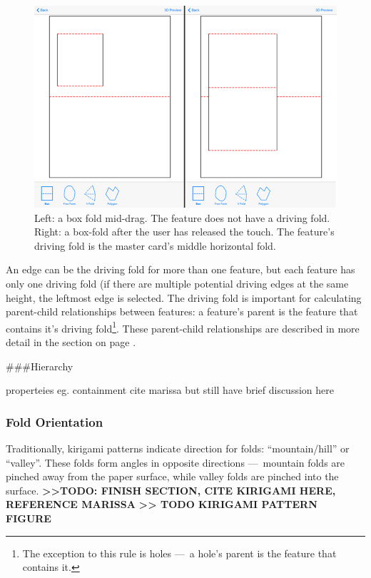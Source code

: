 \begin{figure}[htbp]
\centering
\includegraphics{figures/33_UI_Interface_Data_Structures/boxfold_driving_non_driving.png}
\caption{Left: a box fold mid-drag. The feature does not have a driving
fold. Right: a box-fold after the user has released the touch. The
feature's driving fold is the master card's middle horizontal fold.}
\end{figure}

An edge can be the driving fold for more than one feature, but each
feature has only one driving fold (if there are multiple potential
driving edges at the same height, the leftmost edge is selected. The
driving fold is important for calculating parent-child relationships
between features: a feature's parent is the feature that contains it's
driving fold\footnote{The exception to this rule is holes ---~a hole's
  parent is the feature that contains it.}. These parent-child
relationships are described in more detail in the
 section on page \pageref{nested-features}.

\#\#\#Hierarchy

properteies eg. containment cite marissa but still have brief discussion
here

\subsubsection{Fold Orientation}\label{fold-orientation}

Traditionally, kirigami patterns indicate direction for folds:
``mountain/hill'' or ``valley''. These folds form angles in opposite
directions ---~mountain folds are pinched away from the paper surface,
while valley folds are pinched into the surface.
\textbf{\textgreater{}\textgreater{}TODO: FINISH SECTION, CITE KIRIGAMI
HERE, REFERENCE MARISSA} \textbf{\textgreater{}\textgreater{} TODO
KIRIGAMI PATTERN FIGURE}


